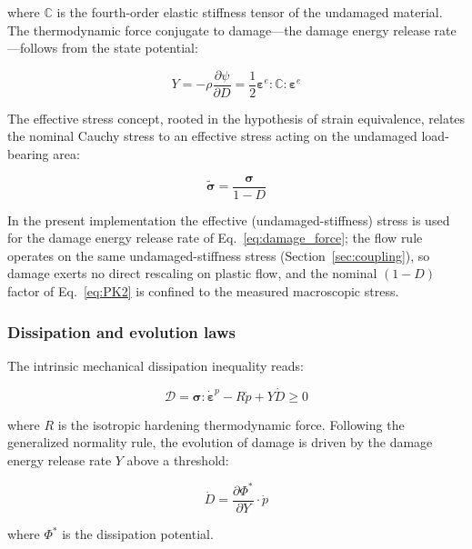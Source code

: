 \documentclass[12pt,a4paper,twocolumn]{article}
\begin{document}
where $\mathbb{C}$ is the fourth-order elastic stiffness tensor of the undamaged material. The thermodynamic force conjugate to damage---the damage energy release rate---follows from the state potential:

\begin{equation}
Y = -\rho\frac{\partial\psi}{\partial D} = \frac{1}{2}\boldsymbol{\varepsilon}^e : \mathbb{C} : \boldsymbol{\varepsilon}^e
\label{eq:damage_force}
\end{equation}

The effective stress concept, rooted in the hypothesis of strain equivalence, relates the nominal Cauchy stress to an effective stress acting on the undamaged load-bearing area:

\begin{equation}
\tilde{\boldsymbol{\sigma}} = \frac{\boldsymbol{\sigma}}{1-D}
\label{eq:effective_stress}
\end{equation}

In the present implementation the effective (undamaged-stiffness) stress is used for the damage energy release rate of Eq.~\eqref{eq:damage_force}; the flow rule operates on the same undamaged-stiffness stress (Section~\ref{sec:coupling}), so damage exerts no direct rescaling on plastic flow, and the nominal $(1-D)$ factor of Eq.~\eqref{eq:PK2} is confined to the measured macroscopic stress.

\subsubsection{Dissipation and evolution laws}

The intrinsic mechanical dissipation inequality reads:

\begin{equation}
\mathcal{D} = \boldsymbol{\sigma} : \dot{\boldsymbol{\varepsilon}}^p - R\dot{p} + Y\dot{D} \ge 0
\label{eq:dissipation}
\end{equation}

where $R$ is the isotropic hardening thermodynamic force. Following the generalized normality rule, the evolution of damage is driven by the damage energy release rate $Y$ above a threshold:

\begin{equation}
\dot{D} = \frac{\partial \Phi^*}{\partial Y} \cdot \dot{p}
\label{eq:damage_evolution_general}
\end{equation}

where $\Phi^*$ is the dissipation potential.
\end{document}

